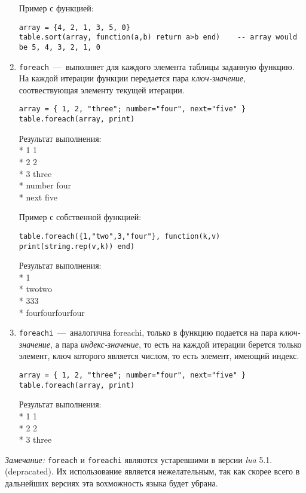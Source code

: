 \begin{enumerate}
Пример с функцией:
\begin{lstlisting}
array = {4, 2, 1, 3, 5, 0}
table.sort(array, function(a,b) return a>b end)    -- array would be 5, 4, 3, 2, 1, 0
\end{lstlisting}
	
	\item \lstinline{foreach}~---~выполняет для каждого элемента таблицы заданную функцию. На каждой итерации функции передается пара \textit{ключ-значение}, соотвествующая элементу текущей итерации.
	
\begin{lstlisting}
array = { 1, 2, "three"; number="four", next="five" }
table.foreach(array, print)   
\end{lstlisting}

Результат выполнения:
\\* 1  		 1		
\\* 2   	 2
\\* 3   	 three
\\* number   four
\\* next     five

Пример с собственной функцией:
\begin{lstlisting}
table.foreach({1,"two",3,"four"}, function(k,v) print(string.rep(v,k)) end)   
\end{lstlisting}

Результат выполнения:
\\* 1
\\* twotwo
\\* 333
\\* fourfourfourfour

	\item \lstinline{foreachi}~---~аналогична foreachi, только в функцию подается на пара \textit{ключ-значение}, а пара \textit{индекс-значение}, то есть на каждой итерации берется только элемент, ключ которого является числом, то есть элемент, имеющий индекс. 
	

\begin{lstlisting}
array = { 1, 2, "three"; number="four", next="five" }
table.foreach(array, print)
\end{lstlisting}

Результат выполнения:
\\* 1  		 1
\\* 2   	 2
\\* 3   	 three

\end{enumerate}


\emph{Замечание:}
\lstinline{foreach} и \lstinline{foreachi} являются устаревшими в версии \emph{lua} 5.1.(depracated). Их использование является нежелательным, так как скорее всего в дальнейших версиях эта вохможность языка будет убрана. 


